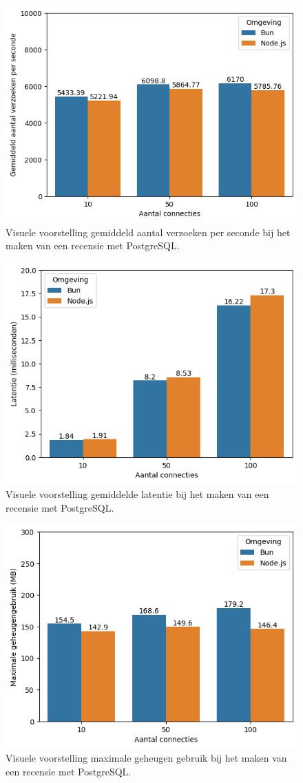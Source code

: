   \begin{figure}[H]
    \centering
    \includegraphics[width=0.7\columnwidth]{graphics/PostPostgresVerzoeken.png}
    \caption[Aantal verzoeken per seconde POST verzoek met PostgreSQL]{\label{fig:postaantalverzoekenpostgres}Visuele voorstelling gemiddeld aantal verzoeken per seconde bij het maken van een recensie met PostgreSQL.}
  \end{figure}
  \begin{figure}[H]
    \centering
    \includegraphics[width=0.7\columnwidth]{graphics/PostPostgresLatentie.png}
    \caption[Latentie POST verzoek met PostgreSQL]{\label{fig:postaantallatentiepostgres}Visuele voorstelling gemiddelde latentie bij het maken van een recensie met PostgreSQL.}
  \end{figure}
  \begin{figure}[H]
    \centering
    \includegraphics[width=0.7\columnwidth]{graphics/PostPostgresRAM.png}
    \caption[Geheugengebruik POST verzoek met PostgreSQL]{\label{fig:postgeheugenpostgres}Visuele voorstelling maximale geheugen gebruik bij het maken van een recensie met PostgreSQL.}
  \end{figure}
